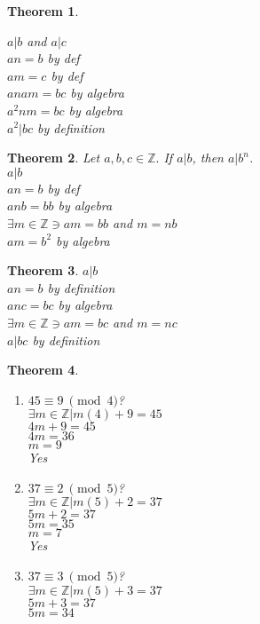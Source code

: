 \documentclass{article}
\newtheorem{theorem}{Theorem}[section]
\begin{document}
\begin{theorem}
\begin{enumerate}
			$a|b$ and $a|c$\\
			$an=b$ by def\\
			$am=c$ by def\\
			$anam=bc$ by algebra\\
			$a^2nm=bc$ by algebra\\
			$a^2|bc$ by definition
	\end{enumerate}
\end{theorem}\begin{theorem} 
	Let $a,b,c \in \mathbb{Z}.$ If $a|b$, then $a|b^n$.\\
	$a|b$\\
	$an=b$ by def\\
	$anb=bb$ by algebra\\
	$\exists m \in \mathbb{Z} \ni am=bb$ and $m=nb$\\
	$am=b^2$ by algebra\\
\end{theorem}\begin{theorem}
	$a|b$\\
	$an=b$ by definition\\
	$anc=bc$ by algebra\\
	$\exists m \in \mathbb{Z} \ni am=bc$ and $m=nc$\\
	$a|bc$ by definition\\
\end{theorem}\begin{theorem}
	\begin{enumerate}
		\item[1]
			$45 \equiv 9~\pmod{4}$?\\
			$\exists m \in \mathbb{Z}|m(4) + 9 = 45$\\
			$4m + 9 = 45$\\
			$4m = 36$\\
			$m = 9$\\
			Yes
		\item[2]
			$37 \equiv 2~\pmod{5}$?\\
			$\exists m \in \mathbb{Z}|m(5) + 2 = 37$\\
			$5m + 2 = 37$\\
			$5m = 35$\\
			$m = 7$\\
			Yes
		\item[3]
			$37 \equiv 3~\pmod{5}$?\\
			$\exists m \in \mathbb{Z}|m(5) + 3 = 37$\\
			$5m + 3 = 37$\\
			$5m = 34$\\

\end{enumerate}
\end{theorem}
\end{document}

